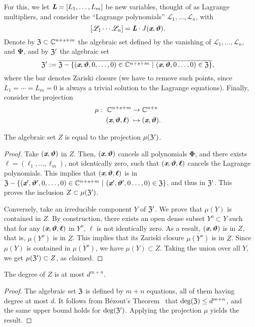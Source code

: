 \documentclass[sigconf]{acmart}
\def\thetab{\bm{\vartheta}}
\def\xb{\textit{\textbf{x}}}
\def\C{\mathbb{C}}
\def\dt{s}
\begin{document}
For this, we let $\textit{\textbf{L}}=[L_1,\hdots,L_m]$ be new
variables, thought of as Lagrange multipliers, and consider the
``Lagrange polynomials'' $\mathscr{L}_1,\dots,\mathscr{L}_{n}$, with
\[
[\mathscr{L}_1 \cdots \mathscr{L}_{n}]=\textit{\textbf{L}}\cdot J(\xb,\thetab).
\] 
Denote by $\frak{Z} \subset \C^{n+\dt+m}$ the algebraic set defined by
the vanishing of $\mathscr{L}_1,\hdots,\mathscr{L}_{n},$ and
$\bm\Psi$, and by $\frak{Z}'$ the algebraic set
\[
\frak{Z}' := \overline{\frak{Z} - \{(\textit{\textbf{x}},\thetab,0,\hdots,0) \in \C^{n+\dt+m}~|~(\textit{\textbf{x}},\thetab,0\hdots,0) \in \frak{Z}\}},
\]
where the bar denotes Zariski closure (we have to remove such points,
since $L_1=\cdots=L_m=0$ is always a trivial solution to the Lagrange
equations). Finally, consider the projection
\begin{align*} 
\mu :~ \C^{n+\dt+m} &\rightarrow \C^{n+\dt}\\
(\textit{\textbf{x}},\thetab,\bm \ell)~ &\mapsto (\textit{\textbf{x}},\thetab).
\end{align*}

\begin{lemma}  
  The algebraic set $Z$ is equal to the projection $\mu(\frak{Z}')$.
\end{lemma}
\begin{proof}
  Take $(\xb,\thetab)$ in $Z$. Then, $(\xb,\thetab)$ cancels all
  polynomials $\bm \Phi$, and there exists $\bm
  \ell=(\ell_1,\dots,\ell_m)$, not identically zero, such that
  $(\xb,\thetab,\bm \ell)$ cancels the Lagrange polynomials. This
  implies that $(\xb,\thetab,\bm \ell)$ is in $\frak{Z} -
  \{(\textit{\textbf{x}}',\thetab',0,\hdots,0) \in
  \C^{n+\dt+m}~|~(\textit{\textbf{x}}',\thetab',0\hdots,0) \in
  \frak{Z}\}$, and thus in $\frak{Z}'$. This proves the inclusion
  $Z \subset \mu(\frak{Z}')$.

  Conversely, take an irreducible component $Y$ of $\frak Z'$. We prove 
  that $\mu(Y)$ is contained in $Z$.
  By construction, there exists an open dense subset $Y^o \subset Y$
  such that for any $(\xb,\thetab,\bm \ell)$ in $Y^o$, $\bm \ell$ is
  not identically zero. As a result, $(\xb,\thetab)$ is in $Z$, that
  is, $\mu(Y^o)$ is in $Z$. This implies that its Zariski closure
  $\overline{\mu(Y^o)}$ is in $Z$. Since $\mu(Y)$ is contained in
  $\overline{\mu(Y^o)}$, we have $\mu(Y) \subset Z$. Taking 
  the union over all $Y$, we get $\mu(\frak Z') \subset Z$, as claimed.
\end{proof}
%
\begin{corollary} 
  The degree of $Z$ is at most $d^{m+n}.$
\end{corollary}
\begin{proof}
  The algebraic set $\frak Z$ is defined by $m+n$ equations, all of
  them having degree at most $d$. It follows from B\'ezout's
  Theorem~\cite{H} that $\deg(\frak{Z}) \leq d^{m+n}$, and the same
  upper bound holds for $\deg(\frak{Z}')$. Applying the projection
  $\mu$ yields the result.
\end{proof}
\end{document}

